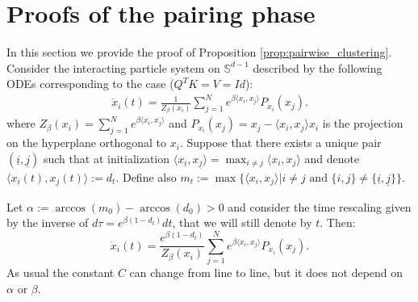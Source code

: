 \documentclass{article}
\numberwithin{theorem}{section}
\begin{document}
\section{Proofs of the pairing phase}\label{app:third}
In this section we provide the proof of Proposition \ref{prop:pairwise_clustering}.
Consider the interacting particle system on $\mathbb{S}^{d-1}$ described by the following ODEs corresponding to the case ($Q^TK=V=Id$):
\begin{align*}
\dot{x}_i(t) = \frac{1}{Z_\beta(x_i)}\sum_{j=1}^N e^{\beta\langle x_i, x_j\rangle} P_{x_i}(x_j).
\end{align*}
where $Z_\beta(x_i) = \sum_{j=1}^N e^{\beta\langle x_i, x_j\rangle}$ and $P_{x_i}(x_j) = x_j - \langle x_i, x_j\rangle x_i$ is the projection on the hyperplane orthogonal to $x_i$.
Suppose that there exists a unique pair $(\underline{i},\underline{j})$ such that at initialization $\langle x_{\underline{i}}, x_{\underline{j}}\rangle = \max_{i\neq j} \langle x_i, x_j\rangle$ and denote $\langle x_{\underline{i}}(t), x_{\underline{j}}(t)\rangle  := d_t$.
Define also $m_t:= \max\{\langle x_i, x_j\rangle| i\neq j\text{ and  }\{i,j\}\neq\{ \underline{i},\underline{j}\}\}$.

Let $\alpha:=\arccos(m_0)-\arccos(d_0)>0$ and
consider the time rescaling given by the inverse of $d\tau = e^{\beta(1-d_t)}dt$, that we will still denote by $t$.
Then:
$$
\dot{x}_i(t) = \frac{e^{\beta(1-d_t)}}{Z_\beta(x_i)}\sum_{j=1}^N e^{\beta\langle x_i, x_j\rangle} P_{x_i}(x_j).
$$
As usual the constant $C$ can change from line to line, but it does not depend on $\alpha$ or $\beta$.
\end{document}
